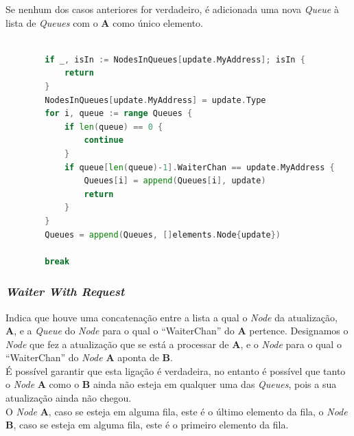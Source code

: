 Se nenhum dos casos anteriores for verdadeiro, é adicionada uma nova \emph{Queue} à lista de \emph{Queues} com o \textbf{A} como único elemento.
\begin{lstlisting}[caption={Alterações nas filas caso o \emph{Node} seja do tipo ``Waiter Terminal''},language=Go]

		if _, isIn := NodesInQueues[update.MyAddress]; isIn {
			return
		}
		NodesInQueues[update.MyAddress] = update.Type
		for i, queue := range Queues {
			if len(queue) == 0 {
				continue
			}
			if queue[len(queue)-1].WaiterChan == update.MyAddress {
				Queues[i] = append(Queues[i], update)
				return
			}
		}
		Queues = append(Queues, []elements.Node{update})

		break

\end{lstlisting}


\subsubsection*{ \emph{Waiter With Request} }
Indica que houve uma concatenação entre a lista a qual o \emph{Node} da atualização, \textbf{A}, e a \emph{Queue} do \emph{Node} para o qual o ``WaiterChan'' do \textbf{A} pertence. 
Designamos o \emph{Node} que fez a atualização que se está a processar de \textbf{A}, e o \emph{Node} para o qual o ``WaiterChan'' do \emph{Node} \textbf{A} aponta de \textbf{B}.\\

É possível garantir que esta ligação é verdadeira, no entanto é possível que tanto o \emph{Node} \textbf{A} como o \textbf{B} ainda não esteja em qualquer uma das \emph{Queues}, pois a sua atualização ainda não chegou.\\

O \emph{Node} \textbf{A}, caso se esteja em alguma fila, este é o último elemento da fila,
o \emph{Node} \textbf{B}, caso se esteja em alguma fila, este é o primeiro elemento da fila.\\

